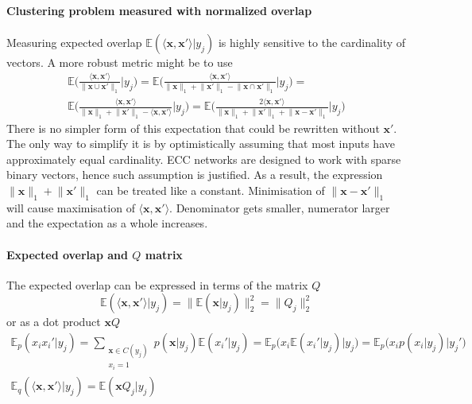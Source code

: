 \documentclass[12pt]{article}
\begin{document}
\paragraph{Clustering problem measured with normalized overlap}
Measuring expected overlap $\mathbb{E}(\langle \boldsymbol{x}, \boldsymbol{x}'\rangle|y_j)$ is highly sensitive to the cardinality of vectors. A more robust metric might be to use
\begin{gather*}
\mathbb{E}\big(\frac{\langle \boldsymbol{x}, \boldsymbol{x}'\rangle}{\lVert \boldsymbol{x}\cup \boldsymbol{x}' \rVert_1}\big|y_j\big) = \mathbb{E}\big(\frac{\langle \boldsymbol{x}, \boldsymbol{x}'\rangle}{\lVert \boldsymbol{x} \rVert_1 + \lVert \boldsymbol{x}' \rVert_1 - \lVert \boldsymbol{x}\cap \boldsymbol{x}' \rVert_1}\big|y_j\big) = \\
\mathbb{E}\big(\frac{\langle \boldsymbol{x}, \boldsymbol{x}'\rangle}{\lVert \boldsymbol{x} \rVert_1 + \lVert \boldsymbol{x}' \rVert_1 - \langle \boldsymbol{x}, \boldsymbol{x}' \rangle}\big|y_j\big)  = \mathbb{E}\big(\frac{2 \langle \boldsymbol{x}, \boldsymbol{x}'\rangle}{\lVert \boldsymbol{x} \rVert_1 + \lVert \boldsymbol{x}' \rVert_1 + \lVert \boldsymbol{x}- \boldsymbol{x}' \rVert_1}\big|y_j\big) 
\end{gather*}
There is no simpler form of this expectation that could be rewritten without $\boldsymbol{x}'$.  The only way to simplify  it is by optimistically assuming that most inputs have approximately equal cardinality. ECC networks are designed to work with sparse binary vectors, hence such assumption is justified. As a result, the expression $\lVert \boldsymbol{x} \rVert_1 + \lVert \boldsymbol{x}' \rVert_1$ can be treated like a constant. Minimisation of $\lVert \boldsymbol{x}- \boldsymbol{x}' \rVert_1$ will cause maximisation of $\langle \boldsymbol{x}, \boldsymbol{x}'\rangle$. Denominator gets smaller, numerator larger and the expectation as a whole increases.

\paragraph{Expected overlap and $Q$ matrix} 
The expected overlap can be expressed in terms of the matrix $Q$
\[
\mathbb{E}(\langle \boldsymbol{x}, \boldsymbol{x}'\rangle|y_j) = \lVert \mathbb{E}(\boldsymbol{x}|y_j) \rVert_2^2 =  \lVert Q_j \rVert_2^2
\]
or as a dot product $\boldsymbol{x}Q$
\begin{gather*}
	\mathbb{E}_p(x_i x_i' | y_j) = 
	\sum_{\substack{\boldsymbol{x}\in C(y_j) \\ x_i=1}} p(\boldsymbol{x}|y_j) \mathbb{E}(x_i'|y_j)= \mathbb{E}_p\big(x_i \mathbb{E}(x_i'|y_j) \big| y_j\big) = \mathbb{E}_p\big(x_i p(x_i|y_j) \big| y_j'\big)\\
	\mathbb{E}_q(\langle \boldsymbol{x}, \boldsymbol{x}'\rangle|y_j) = \mathbb{E}(\boldsymbol{x} Q_j | y_j)
\end{gather*}
\end{document}
